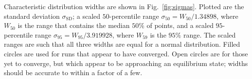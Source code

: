 \documentclass[useAMS,usedcolumn,usegraphicx,usenatbib]{mn2e}
\newcommand{\figref}[1]{Fig.~\ref{fig:#1}}
\newcommand{\sub}[1]{\ensuremath{_\mathrm{#1}}}
\begin{document}
Characteristic distribution widths are shown in \figref{sigmas}. Plotted are the standard deviation $\sigma\sub{SD}$; a scaled $50$-percentile range $\sigma_{50} = W_{50}/1.34898$, where $W_{50}$ is the range that contains the median $50\%$ of points, and a scaled $95$-percentile range $\sigma_{95} = W_{95}/3.919928$, where $W_{59}$ is the $95\%$ range. The scaled ranges are such that all three widths are equal for a normal distribution. Filled circles are used for runs that appear to have converged. Open circles are for those yet to converge, but which appear to be approaching an equilibrium state; widths should be accurate to within a factor of a few.
\begin{figure}
\begin{center}
 \quad
{} \\
 \quad

\end{center}
\end{figure}
\end{document}
